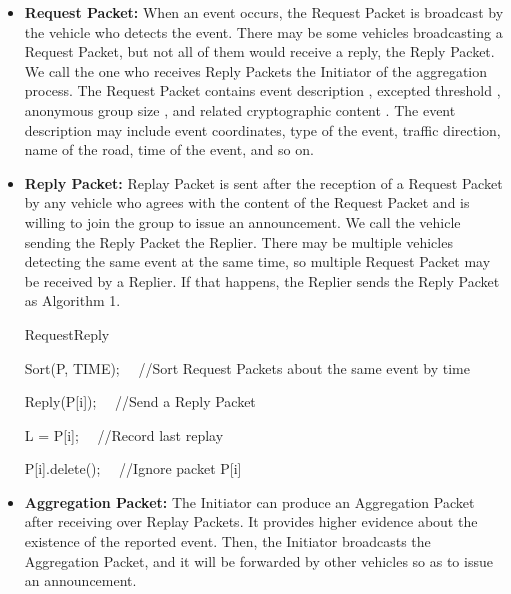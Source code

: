 \documentclass[a4paper]{article}
\begin{document}
\begin{itemize}
  \item \textbf{Request Packet: } When an event occurs, the Request Packet is broadcast by the vehicle who detects the event. There may be some vehicles broadcasting a Request Packet, but not all of them would receive a reply, the Reply Packet. We call the one who receives Reply Packets the Initiator of the aggregation process. The Request Packet contains event description , excepted threshold , anonymous group size , and related cryptographic content . The event description  may include event coordinates, type of the event, traffic direction, name of the road, time of the event, and so on.
  \item \textbf{Reply Packet: } Replay Packet is sent after the reception of a Request Packet by any vehicle who agrees with the content of the Request Packet and is willing to join the group to issue an announcement. We call the vehicle sending the Reply Packet the Replier. There may be multiple vehicles detecting the same event at the same time, so multiple Request Packet may be received by a Replier. If that happens, the Replier sends the Reply Packet as Algorithm 1.

\begin{algorithm}
\caption{RequestReply}

Sort(P, TIME);  ~~//Sort Request Packets about the same event by time

{
    {
        Reply(P[i]);    ~~//Send a Reply Packet

        L = P[i];  ~~//Record last replay
    }
    \Else
    {
        P[i].delete();  ~~//Ignore packet P[i]
    }
}
\end{algorithm}

  \item \textbf{Aggregation Packet: } The Initiator can produce an Aggregation Packet after receiving over  Replay Packets. It provides higher evidence about the existence of the reported event. Then, the Initiator broadcasts the Aggregation Packet, and it will be forwarded by other vehicles so as to issue an announcement.
\end{itemize}
\end{document}
